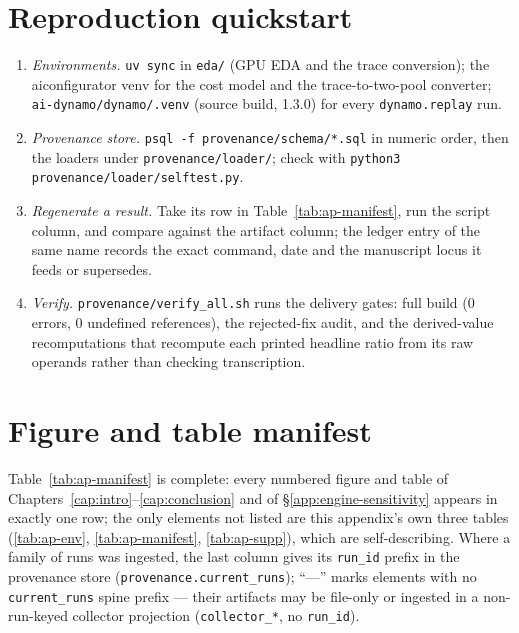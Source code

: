 \section{Reproduction quickstart}
\label{sec:ap-quickstart}

\begin{enumerate}\setlength{\itemsep}{0pt}\setlength{\parskip}{0pt}
\item \emph{Environments.} \texttt{uv sync} in \texttt{eda/} (GPU EDA and the
  trace conversion); the aiconfigurator venv for the cost model and the
  trace-to-two-pool converter; \texttt{ai-dynamo/dynamo/.venv} (source build,
  1.3.0) for every \texttt{dynamo.replay} run.
\item \emph{Provenance store.} \texttt{psql -f provenance/schema/*.sql} in
  numeric order, then the loaders under \texttt{provenance/loader/}; check with
  \texttt{python3 provenance/loader/selftest.py}.
\item \emph{Regenerate a result.} Take its row in Table~\ref{tab:ap-manifest},
  run the script column, and compare against the artifact column; the ledger
  entry of the same name records the exact command, date and the manuscript
  locus it feeds or supersedes.
\item \emph{Verify.} \texttt{provenance/verify\_all.sh} runs the delivery
  gates: full build (0 errors, 0 undefined references), the rejected-fix audit,
  and the derived-value recomputations that recompute each printed headline
  ratio from its raw operands rather than checking transcription.
\end{enumerate}

\section{Figure and table manifest}

Table~\ref{tab:ap-manifest} is complete: every numbered figure and table of
Chapters~\ref{cap:intro}--\ref{cap:conclusion} and of
\S\ref{app:engine-sensitivity} appears in exactly one row; the only elements
not listed are this appendix's own three tables (\ref{tab:ap-env},
\ref{tab:ap-manifest}, \ref{tab:ap-supp}), which are self-describing. Where a
family of runs was ingested,
the last column gives its \texttt{run\_id} prefix in the provenance store
(\texttt{provenance.current\_runs}); ``---'' marks elements with no
\texttt{current\_runs} spine prefix --- their artifacts may be file-only
or ingested in a non-run-keyed collector projection
(\texttt{collector\_*}, no \texttt{run\_id}).

